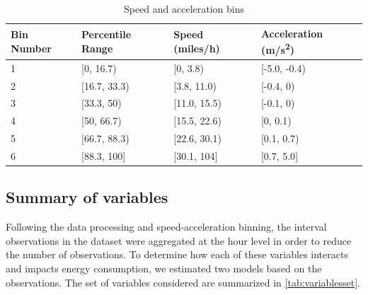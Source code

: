 \documentclass[times]{TRR}
\begin{document}
\begin{table}[ht!]
\centering
\caption{Speed and acceleration bins}
\label{tab:bintable} \small
{}
\begin{tabular}{l l l l}
\toprule
\textbf{Bin Number} & \textbf{Percentile Range} & \textbf{Speed (miles/h)} & \textbf{Acceleration (m/s\textsuperscript{2})} \\ \midrule 
1 & {[}0, 16.7) & {[}0, 3.8) & {[}-5.0, -0.4) \\  
2 & {[}16.7, 33.3) & {[}3.8, 11.0) & {[}-0.4, 0) \\  
3 & {[}33.3, 50) & {[}11.0, 15.5) & {[}-0.1, 0) \\  
4 & {[}50, 66.7) & {[}15.5, 22.6) & {[}0, 0.1) \\  
5 & {[}66.7, 88.3) & {[}22.6, 30.1) & {[}0.1, 0.7) \\  
6 & {[}88.3, 100{]} & {[}30.1, 104{]} & {[}0.7, 5.0{]} \\ \bottomrule
\end{tabular}
\end{table}

\subsection{Summary of variables}
Following the data processing and speed-acceleration binning, the interval observations in the dataset were aggregated at the hour level in order to reduce the number of observations. To determine how each of these variables interacts and impacts energy consumption, we estimated two models based on the observations.
The set of variables considered are summarized in \autoref{tab:variablesset}.
\end{document}
